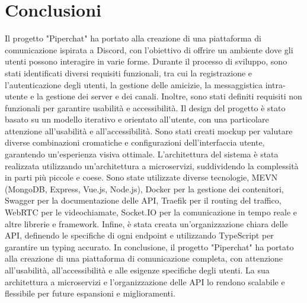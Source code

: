 \chapter{Conclusioni}

Il progetto "Piperchat" ha portato alla creazione di una piattaforma di comunicazione ispirata a Discord, con l'obiettivo di offrire un ambiente dove gli utenti possono interagire in varie forme.
%
Durante il processo di sviluppo, sono stati identificati diversi requisiti funzionali, tra cui la registrazione e l'autenticazione degli utenti, la gestione delle amicizie, la messaggistica intra-utente e la gestione dei server e dei canali.
%
Inoltre, sono stati definiti requisiti non funzionali per garantire usabilità e accessibilità.
%
Il design del progetto è stato basato su un modello iterativo e orientato all'utente, con una particolare attenzione all'usabilità e all'accessibilità.
%
Sono stati creati mockup per valutare diverse combinazioni cromatiche e configurazioni dell'interfaccia utente, garantendo un'esperienza visiva ottimale.
%
L'architettura del sistema è stata realizzata utilizzando un'architettura a microservizi, suddividendo la complessità in parti più piccole e coese.
%
Sono state utilizzate diverse tecnologie, MEVN (MongoDB, Express, Vue.js, Node.js), Docker per la gestione dei contenitori, Swagger per la documentazione delle API, Traefik per il routing del traffico, WebRTC per le videochiamate, Socket.IO per la comunicazione in tempo reale e altre librerie e framework.
%
Infine, è stata creata un'organizzazione chiara delle API, definendo le specifiche di ogni endpoint e utilizzando TypeScript per garantire un typing accurato.
%
In conclusione, il progetto "Piperchat" ha portato alla creazione di una piattaforma di comunicazione completa, con attenzione all'usabilità, all'accessibilità e alle esigenze specifiche degli utenti.
%
La sua architettura a microservizi e l'organizzazione delle API lo rendono scalabile e flessibile per future espansioni e miglioramenti.

